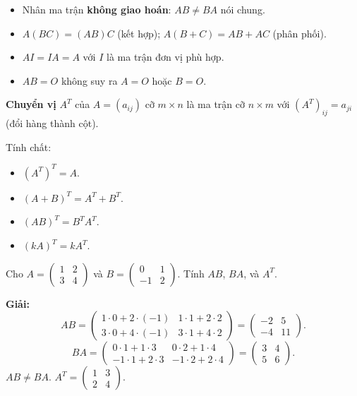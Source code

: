 \documentclass[12pt,a4paper]{article}
\begin{document}
\begin{luuy}
  \begin{itemize}
    \item Nhân ma trận \textbf{không giao hoán}: $AB \ne BA$ nói chung.
    \item $A(BC) = (AB)C$ (kết hợp); $A(B+C) = AB + AC$ (phân phối).
    \item $AI = IA = A$ với $I$ là ma trận đơn vị phù hợp.
    \item $AB = O$ không suy ra $A = O$ hoặc $B = O$.
  \end{itemize}
\end{luuy}

\begin{congthuc}[title={Ma trận chuyển vị}]
  \textbf{Chuyển vị} $A^T$ của $A = (a_{ij})$ cỡ $m \times n$ là ma trận cỡ $n \times m$ với $(A^T)_{ij} = a_{ji}$ (đổi hàng thành cột).

  Tính chất:
  \begin{itemize}
    \item $(A^T)^T = A$.
    \item $(A + B)^T = A^T + B^T$.
    \item $(AB)^T = B^T A^T$.
    \item $(kA)^T = k A^T$.
  \end{itemize}
\end{congthuc}

\begin{vidu}
  Cho $A = \begin{pmatrix}1 & 2 \\ 3 & 4\end{pmatrix}$ và $B = \begin{pmatrix}0 & 1 \\ -1 & 2\end{pmatrix}$. Tính $AB$, $BA$, và $A^T$.

  \medskip\textbf{Giải:}
  \[
    AB = \begin{pmatrix}1\cdot0+2\cdot(-1) & 1\cdot1+2\cdot2 \\ 3\cdot0+4\cdot(-1) & 3\cdot1+4\cdot2\end{pmatrix} = \begin{pmatrix}-2 & 5 \\ -4 & 11\end{pmatrix}.
  \]
  \[
    BA = \begin{pmatrix}0\cdot1+1\cdot3 & 0\cdot2+1\cdot4 \\ -1\cdot1+2\cdot3 & -1\cdot2+2\cdot4\end{pmatrix} = \begin{pmatrix}3 & 4 \\ 5 & 6\end{pmatrix}.
  \]
  $AB \ne BA$. \quad $A^T = \begin{pmatrix}1 & 3 \\ 2 & 4\end{pmatrix}$.
\end{vidu}
\end{document}
